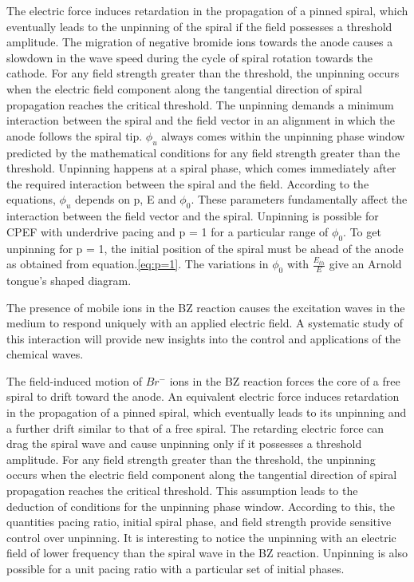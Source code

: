 \documentclass[%
 reprint,
 amsmath,amssymb,
 aps,
prb,
]{revtex4-2}
\begin{document}
The electric force induces retardation in the propagation of a pinned spiral, which eventually leads to the unpinning of the spiral if the field possesses a threshold amplitude. 
The migration of negative bromide ions towards the anode causes a slowdown in the wave speed during the cycle of spiral rotation towards the cathode.
For any field strength greater than the threshold, the unpinning occurs when the electric field component along the tangential direction of spiral propagation reaches the critical threshold.
The unpinning demands a minimum interaction between the spiral and the field vector in an alignment in which the anode follows the spiral tip.
$\phi_u$ always comes within the unpinning phase window predicted by the mathematical conditions for any field strength greater than the threshold. Unpinning happens at a spiral phase, which comes immediately after the required interaction between the spiral and the field.
According to the equations, $\phi_u$ depends on p, E and $\phi_0$. These parameters fundamentally affect the interaction between the field vector and the spiral. 
Unpinning is possible for CPEF with underdrive pacing and p = 1 for a particular range of $\phi_0$. To get unpinning for p = 1, the initial position of the spiral must be ahead of the anode as obtained from equation.\ref{eq:p=1}.  The variations in $\phi_0$ with $\frac{E_{th}}{E}$ give an Arnold tongue's shaped diagram. 

The presence of mobile ions in the BZ reaction causes the excitation waves in the medium to respond uniquely with an applied electric field. A systematic study of this interaction will provide new insights into the control and applications of the chemical waves.

\iffalse
The field-induced motion of $Br^-$ ions in the BZ reaction forces the core of a free spiral to drift toward the anode. An equivalent electric force induces retardation in the propagation of a pinned spiral, which eventually leads to its unpinning and a further drift similar to that of a free spiral. The retarding electric force can drag the spiral wave and cause unpinning only if it possesses a threshold amplitude. 
For any field strength greater than the threshold, the unpinning occurs when the electric field component along the tangential direction of spiral propagation reaches the critical threshold. This assumption leads to the deduction of conditions for the unpinning phase window.
According to this, the quantities pacing ratio, initial spiral phase, and field strength provide sensitive control over unpinning. It is interesting to notice the unpinning with an electric field of lower frequency than the spiral wave in the BZ reaction. Unpinning is also possible for a unit pacing ratio with a particular set of initial phases. 
\end{document}
